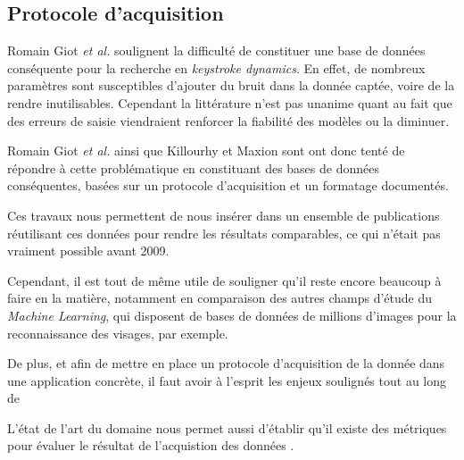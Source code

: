 \subsection{Protocole d'acquisition}

Romain Giot \textit{et al.}  soulignent la difficulté de constituer une base de données conséquente pour la recherche en \textit{keystroke dynamics}. En effet, de nombreux paramètres sont susceptibles d'ajouter du bruit dans la donnée captée, voire de la rendre inutilisables. Cependant la littérature n'est pas unanime quant au fait que des erreurs de saisie viendraient renforcer la fiabilité des modèles ou la diminuer.

Romain Giot \textit{et al.}  ainsi que Killourhy et Maxion  sont ont donc tenté de répondre à cette problématique en constituant des bases de données conséquentes, basées sur un protocole d'acquisition et un formatage documentés.

Ces travaux nous permettent de nous insérer dans un ensemble de publications réutilisant ces données pour rendre les résultats comparables, ce qui n'était pas vraiment possible avant 2009.

Cependant, il est tout de même utile de souligner qu'il reste encore beaucoup à faire en la matière, notamment en comparaison des autres champs d'étude du \textit{Machine Learning}, qui disposent de bases de données de millions d'images pour la reconnaissance des visages, par exemple.

De plus, et afin de mettre en place un protocole d'acquisition de la donnée dans une application concrète, il faut avoir à l'esprit les enjeux soulignés tout au long de 

L'état de l'art du domaine nous permet aussi d'établir qu'il existe des métriques pour évaluer le résultat de l'acquistion des données .